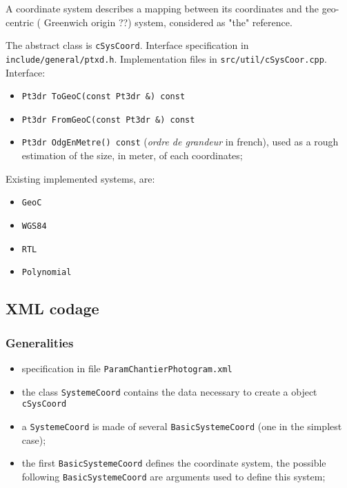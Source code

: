 A coordinate system describes a mapping between its coordinates
and the geo-centric ( Greenwich origin ??) system, considered
as "the" reference.

The abstract \CPP  class is {\tt cSysCoord}.
Interface specification in {\tt include/general/ptxd.h}.
Implementation files in {\tt src/util/cSysCoor.cpp}.
Interface:

\begin{itemize}
    \item {\tt Pt3dr ToGeoC(const Pt3dr \&) const}
    \item {\tt Pt3dr FromGeoC(const Pt3dr \&) const}
    \item {\tt Pt3dr OdgEnMetre() const} (\emph{ordre de grandeur} in french),
         used as a rough estimation of the size, in meter, of each coordinates;
\end{itemize}

Existing implemented systems, are:

\begin{itemize}
   \item  {\tt GeoC}
   \item  {\tt WGS84}
   \item  {\tt RTL}
   \item  {\tt Polynomial}
\end{itemize}



\subsection{XML codage}



\subsubsection{Generalities}

\begin{itemize}
   \item specification in file {\tt ParamChantierPhotogram.xml}
   \item the class {\tt SystemeCoord} contains the data necessary to create a \CPP object {\tt cSysCoord}
   \item  a {\tt SystemeCoord} is made of several {\tt BasicSystemeCoord} (one in the simplest case);

   \item the first  {\tt BasicSystemeCoord} defines the coordinate system, the possible following
          {\tt BasicSystemeCoord} are arguments used to define this system;
\end{itemize}


